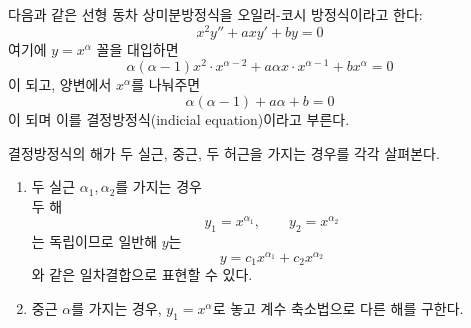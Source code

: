 \documentclass[../engineering_mathematics_lecture_note.tex]{subfiles}
\begin{document}
\begin{example}
    다음과 같은 선형 동차 상미분방정식을 오일러-코시 방정식이라고 한다:
    \begin{equation*}
        x^2 y'' + ax y' + by = 0
    \end{equation*}
    여기에 $y = x^\alpha$ 꼴을 대입하면
    \begin{equation*}
        \alpha (\alpha - 1) x^2 \cdot x^{\alpha - 2} + a \alpha x \cdot x^{\alpha - 1} + b x^\alpha = 0
    \end{equation*}
    이 되고, 양변에서 $x^\alpha$를 나눠주면
    \begin{equation*}
        \alpha (\alpha - 1) + a\alpha + b = 0
    \end{equation*}
    이 되며 이를 결정방정식(indicial equation)이라고 부른다.

    결정방정식의 해가 두 실근, 중근, 두 허근을 가지는 경우를 각각 살펴본다.
    \begin{enumerate}
        \item 두 실근 $\alpha_1, \alpha_2$를 가지는 경우\\
            두 해
            \begin{equation*}
                y_1 = x^{\alpha_1}, \qquad y_2 = x^{\alpha_2}
            \end{equation*}
            는 독립이므로 일반해 $y$는
            \begin{equation*}
                y = c_1 x^{\alpha_1} + c_2 x^{\alpha_2}
            \end{equation*}
            와 같은 일차결합으로 표현할 수 있다.

        \item 중근 $\alpha$를 가지는 경우, $y_1 = x^\alpha$로 놓고 계수 축소법으로 다른 해를 구한다.


\end{enumerate}
\end{example}
\end{document}
